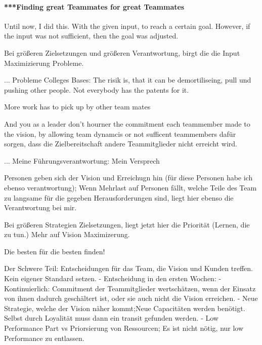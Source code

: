 \paragraph{***Finding great Teammates for great Teammates}






Until now, I did this. With the given input, to reach a certain goal. However, if the input was not sufficient, then the goal was adjusted.

Bei größeren Zielsetzungen und größeren Verantwortung, birgt die die Input Maximizierung Probleme.

... Probleme
Colleges Bases: The risik is, that it can be demortiliseing, pull und pushing other people. Not everybody has the patents for it.

More work has to pick up by other team mates

And you as a leader don't hourner the commitment each teammember made to the vision, by allowing team dynamcis or not sufficent teammembers dafür sorgen, dass die Zielbereitschaft andere Teammitglieder nicht erreicht wird.


... Meine Führungsverantwortung:
Mein Versprech

Personen geben sich der Vision und Erreichugn hin (für diese Personen habe ich ebenso verantwortung); Wenn Mehrlast auf Personen fällt, welche Teile des Team zu langsame für die gegeben Herausforderungen sind, liegt hier ebenso die Verantwortung bei mir.


Bei größeren Strategien Zielsetzungen, liegt jetzt hier die Priorität (Lernen, die zu tun.)
Mehr auf Vision Maximizerung.

Die besten für die besten finden!


Der Schwere Teil: Entscheidungen für das Team, die Vision und Kunden treffen. Kein eigener Standard setzen.
- Entscheidung in den ersten Wochen: 
- Kontinuierlich: Commitment der Teammitglieder wertschätzen, wenn der Einsatz von ihnen dadurch geschältert ist, oder sie auch nicht die Vision erreichen.
- Neue Strategie, welche der Vision näher kommt;Neue Capacitäten werden benötigt. Selbst durch Loyalität muss dann ein transit gefunden werden.
- Low Performance Part vs Priorsierung von Ressourcen; Es ist nicht nötig, nur low Performance zu entlassen.

